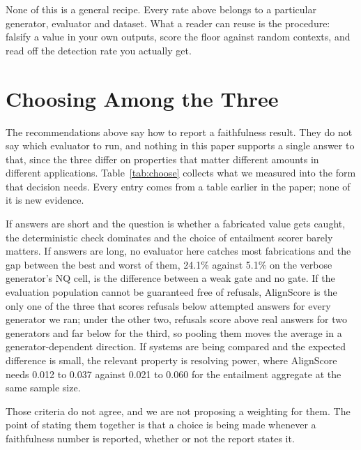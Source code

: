 \documentclass[11pt]{article}
\begin{document}
None of this is a general recipe. Every rate above belongs to a particular generator, evaluator and dataset. What a reader can reuse is the procedure: falsify a value in your own outputs, score the floor against random contexts, and read off the detection rate you actually get.

\section{Choosing Among the Three}
\label{sec:choosing}

The recommendations above say how to report a faithfulness result. They do not say which evaluator to run, and nothing in this paper supports a single answer to that, since the three differ on properties that matter different amounts in different applications. Table~\ref{tab:choose} collects what we measured into the form that decision needs. Every entry comes from a table earlier in the paper; none of it is new evidence.

If answers are short and the question is whether a fabricated value gets caught, the deterministic check dominates and the choice of entailment scorer barely matters. If answers are long, no evaluator here catches most fabrications and the gap between the best and worst of them, 24.1\% against 5.1\% on the verbose generator's NQ cell, is the difference between a weak gate and no gate. If the evaluation population cannot be guaranteed free of refusals, AlignScore is the only one of the three that scores refusals below attempted answers for every generator we ran; under the other two, refusals score above real answers for two generators and far below for the third, so pooling them moves the average in a generator-dependent direction. If systems are being compared and the expected difference is small, the relevant property is resolving power, where AlignScore needs 0.012 to 0.037 against 0.021 to 0.060 for the entailment aggregate at the same sample size.

Those criteria do not agree, and we are not proposing a weighting for them. The point of stating them together is that a choice is being made whenever a faithfulness number is reported, whether or not the report states it.
\end{document}
